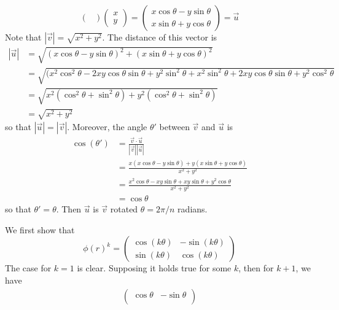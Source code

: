 \begin{problems}
\begin{solalph}
\[\begin{pmatrix}
        \end{pmatrix}
        \begin{pmatrix}
            x \\
            y
        \end{pmatrix} = 
        \begin{pmatrix}
            x\cos\theta - y\sin\theta \\
            x\sin\theta + y\cos\theta
        \end{pmatrix} = \vec u
        \]
        Note that $|\vec v| = \sqrt{x^2 + y^2}$. The distance of this vector is
        \begin{align*}
            |\vec u| & = \sqrt{(x\cos\theta - y\sin\theta)^2 + (x\sin\theta + y\cos\theta)^2} \\
            & = \sqrt{(x^2\cos^2\theta - 2xy\cos\theta\sin\theta + y^2\sin^2\theta + x^2\sin^2\theta + 2xy\cos\theta\sin\theta + y^2\cos^2\theta} \\
            & = \sqrt{x^2(\cos^2\theta + \sin^2\theta) + y^2(\cos^2\theta + \sin^2\theta)} \\
            & = \sqrt{x^2 + y^2}
        \end{align*}
        so that $|\vec u| = |\vec v|$. Moreover, the angle $\theta'$ between $\vec v$ and $\vec u$ is
        \begin{align*}
            \cos(\theta') & = \frac{\vec v \cdot \vec u}{|\vec v||\vec u|} \\
            & = \frac{x(x\cos\theta - y\sin\theta) + y(x\sin\theta + y\cos\theta)}{x^2 + y^2} \\
            & = \frac{x^2\cos\theta - xy\sin\theta + xy\sin\theta + y^2\cos\theta}{x^2 + y^2} \\
            & = \cos\theta
        \end{align*}
        so that $\theta' = \theta$. Then $\vec u$ is $\vec v$ rotated $\theta = 2\pi/n$ radians.
        \item We first show that
        \[\phi(r)^k = 
        \begin{pmatrix}
            \cos(k\theta) & -\sin(k\theta) \\
            \sin(k\theta) & \cos(k\theta)
        \end{pmatrix}\]
        The case for $k = 1$ is clear. Supposing it holds true for some $k$, then for $k + 1$, we have
        \begin{align*}
            \begin{pmatrix}
                \cos\theta & -\sin\theta \\

\end{pmatrix}
\end{align*}
\end{solalph}
\end{problems}
